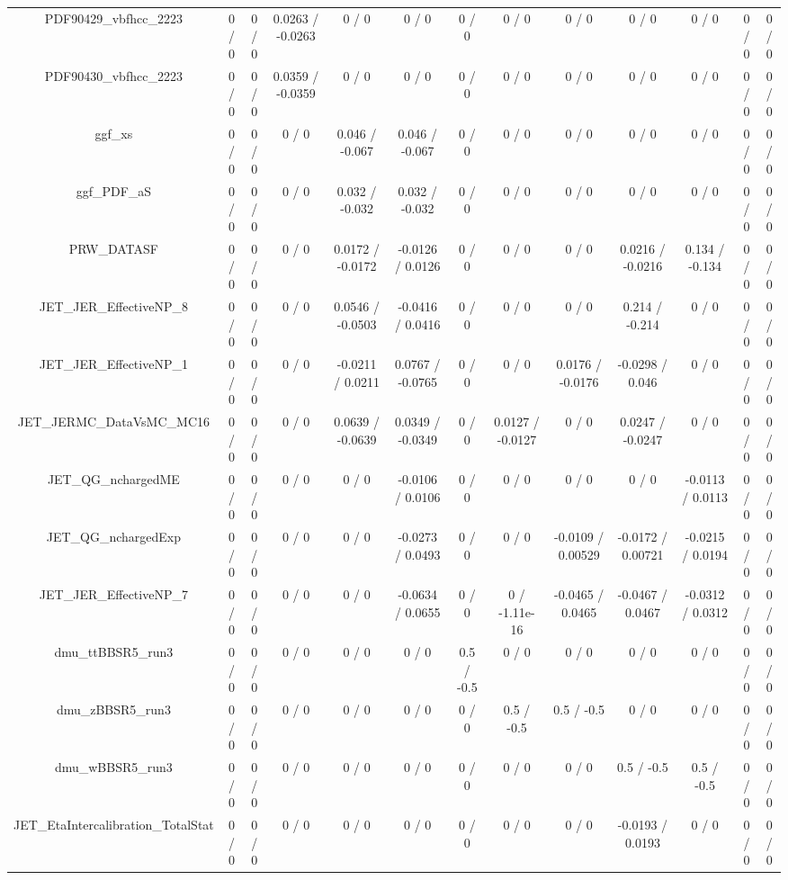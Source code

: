 \documentclass[10pt]{article}
\begin{document}
\begin{table}[htbp]
\begin{center}
\begin{tabular}{|c|c|c|c|c|c|c|c|c|c|c|c|c|}
  PDF90429_vbfhcc_2223 & 0 / 0 & 0 / 0 & 0.0263 / -0.0263 & 0 / 0 & 0 / 0 & 0 / 0 & 0 / 0 & 0 / 0 & 0 / 0 & 0 / 0 & 0 / 0 & 0 / 0 \\ 
  PDF90430_vbfhcc_2223 & 0 / 0 & 0 / 0 & 0.0359 / -0.0359 & 0 / 0 & 0 / 0 & 0 / 0 & 0 / 0 & 0 / 0 & 0 / 0 & 0 / 0 & 0 / 0 & 0 / 0 \\ 
  ggf_xs & 0 / 0 & 0 / 0 & 0 / 0 & 0.046 / -0.067 & 0.046 / -0.067 & 0 / 0 & 0 / 0 & 0 / 0 & 0 / 0 & 0 / 0 & 0 / 0 & 0 / 0 \\ 
  ggf_PDF_aS & 0 / 0 & 0 / 0 & 0 / 0 & 0.032 / -0.032 & 0.032 / -0.032 & 0 / 0 & 0 / 0 & 0 / 0 & 0 / 0 & 0 / 0 & 0 / 0 & 0 / 0 \\ 
  PRW_DATASF & 0 / 0 & 0 / 0 & 0 / 0 & 0.0172 / -0.0172 & -0.0126 / 0.0126 & 0 / 0 & 0 / 0 & 0 / 0 & 0.0216 / -0.0216 & 0.134 / -0.134 & 0 / 0 & 0 / 0 \\ 
  JET_JER_EffectiveNP_8 & 0 / 0 & 0 / 0 & 0 / 0 & 0.0546 / -0.0503 & -0.0416 / 0.0416 & 0 / 0 & 0 / 0 & 0 / 0 & 0.214 / -0.214 & 0 / 0 & 0 / 0 & 0 / 0 \\ 
  JET_JER_EffectiveNP_1 & 0 / 0 & 0 / 0 & 0 / 0 & -0.0211 / 0.0211 & 0.0767 / -0.0765 & 0 / 0 & 0 / 0 & 0.0176 / -0.0176 & -0.0298 / 0.046 & 0 / 0 & 0 / 0 & 0 / 0 \\ 
  JET_JERMC_DataVsMC_MC16 & 0 / 0 & 0 / 0 & 0 / 0 & 0.0639 / -0.0639 & 0.0349 / -0.0349 & 0 / 0 & 0.0127 / -0.0127 & 0 / 0 & 0.0247 / -0.0247 & 0 / 0 & 0 / 0 & 0 / 0 \\ 
  JET_QG_nchargedME & 0 / 0 & 0 / 0 & 0 / 0 & 0 / 0 & -0.0106 / 0.0106 & 0 / 0 & 0 / 0 & 0 / 0 & 0 / 0 & -0.0113 / 0.0113 & 0 / 0 & 0 / 0 \\ 
  JET_QG_nchargedExp & 0 / 0 & 0 / 0 & 0 / 0 & 0 / 0 & -0.0273 / 0.0493 & 0 / 0 & 0 / 0 & -0.0109 / 0.00529 & -0.0172 / 0.00721 & -0.0215 / 0.0194 & 0 / 0 & 0 / 0 \\ 
  JET_JER_EffectiveNP_7 & 0 / 0 & 0 / 0 & 0 / 0 & 0 / 0 & -0.0634 / 0.0655 & 0 / 0 & 0 / -1.11e-16 & -0.0465 / 0.0465 & -0.0467 / 0.0467 & -0.0312 / 0.0312 & 0 / 0 & 0 / 0 \\ 
  dmu_ttBBSR5_run3 & 0 / 0 & 0 / 0 & 0 / 0 & 0 / 0 & 0 / 0 & 0.5 / -0.5 & 0 / 0 & 0 / 0 & 0 / 0 & 0 / 0 & 0 / 0 & 0 / 0 \\ 
  dmu_zBBSR5_run3 & 0 / 0 & 0 / 0 & 0 / 0 & 0 / 0 & 0 / 0 & 0 / 0 & 0.5 / -0.5 & 0.5 / -0.5 & 0 / 0 & 0 / 0 & 0 / 0 & 0 / 0 \\ 
  dmu_wBBSR5_run3 & 0 / 0 & 0 / 0 & 0 / 0 & 0 / 0 & 0 / 0 & 0 / 0 & 0 / 0 & 0 / 0 & 0.5 / -0.5 & 0.5 / -0.5 & 0 / 0 & 0 / 0 \\ 
  JET_EtaIntercalibration_TotalStat & 0 / 0 & 0 / 0 & 0 / 0 & 0 / 0 & 0 / 0 & 0 / 0 & 0 / 0 & 0 / 0 & -0.0193 / 0.0193 & 0 / 0 & 0 / 0 & 0 / 0 \\ 

\end{tabular}
\end{center}
\end{table}
\end{document}
